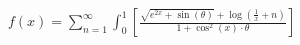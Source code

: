 \documentclass[preview]{standalone}
\begin{document}
\begin{align*}
f(x) = \sum_{n=1}^{\infty} \int_{0}^{1} \left[ \frac{\sqrt{e^{2x} + \sin(\theta)} + \log(\frac{1}{x} + n)}{1 + \cos^2(x) \cdot \theta} \right]
\end{align*}
\end{document}
